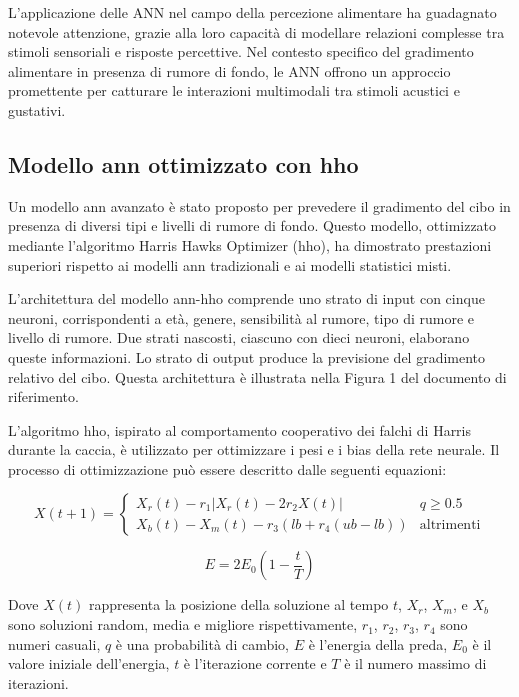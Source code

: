 L'applicazione delle ANN nel campo della percezione alimentare ha guadagnato notevole attenzione, grazie alla loro capacità di modellare relazioni complesse tra stimoli sensoriali e risposte percettive. Nel contesto specifico del gradimento alimentare in presenza di rumore di fondo, le ANN offrono un approccio promettente per catturare le interazioni multimodali tra stimoli acustici e gustativi.

\subsection{Modello \gls{ann} ottimizzato con \gls{hho}}
\noindent

Un modello \gls{ann} avanzato è stato proposto per prevedere il gradimento del cibo in presenza di diversi tipi e livelli di rumore di fondo. Questo modello, ottimizzato mediante l'algoritmo Harris Hawks Optimizer (\gls{hho}), ha dimostrato prestazioni superiori rispetto ai modelli \gls{ann} tradizionali e ai modelli statistici misti.

L'architettura del modello \gls{ann}-\gls{hho} comprende uno strato di input con cinque neuroni, corrispondenti a età, genere, sensibilità al rumore, tipo di rumore e livello di rumore. Due strati nascosti, ciascuno con dieci neuroni, elaborano queste informazioni. Lo strato di output produce la previsione del gradimento relativo del cibo. Questa architettura è illustrata nella Figura 1 del documento di riferimento.

L'algoritmo \gls{hho}, ispirato al comportamento cooperativo dei falchi di Harris durante la caccia, è utilizzato per ottimizzare i pesi e i bias della rete neurale. Il processo di ottimizzazione può essere descritto dalle seguenti equazioni:

\[X(t+1) = \begin{cases} 
   X_r(t) - r_1|X_r(t) - 2r_2X(t)| & q \geq 0.5 \\
   X_b(t) - X_m(t) - r_3(lb + r_4(ub - lb)) & \text{altrimenti}
\end{cases}\]

\[E = 2E_0(1 - \frac{t}{T})\]

Dove $X(t)$ rappresenta la posizione della soluzione al tempo $t$, $X_r$, $X_m$, e $X_b$ sono soluzioni random, media e migliore rispettivamente, $r_1$, $r_2$, $r_3$, $r_4$ sono numeri casuali, $q$ è una probabilità di cambio, $E$ è l'energia della preda, $E_0$ è il valore iniziale dell'energia, $t$ è l'iterazione corrente e $T$ è il numero massimo di iterazioni.

